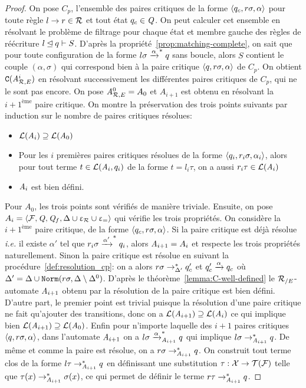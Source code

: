 \begin{proof}
  On pose $C_p$, l'ensemble des paires critiques de la forme $\langle q_c, r\sigma, \alpha\rangle$ pour toute règle $l\rightarrow r \in \mathcal R$ et tout état $q_c \in \mathit Q$.
  On peut calculer cet ensemble en résolvant le problème de filtrage pour chaque état et membre gauche des règles de réécriture $l \unlhd q \vdash S$.
  D'après la propriété~\ref{prop:matching-complete}, on sait que pour toute configuration de la forme $l\sigma \xrightarrow{\alpha}^* q$ sans boucle,
  alors $S$ contient le couple $(\alpha,\sigma)$ qui correspond bien à la paire critique $\langle q, r\sigma, \alpha \rangle$ de $C_p$.
  On obtient $\mathtt{C}({\mathit A}_{\mathcal R,E}^i)$ en résolvant successivement les différentes paires critiques de $C_p$, qui ne le sont pas encore.
  On pose ${\mathit A}_{\mathcal R,E}^0 = A_0$ et $A_{i+1}$ est obtenu en résolvant la $i+1^\text{ème}$ paire critique.
  On montre la préservation des trois points suivants par induction sur le nombre de paires critiques résolues:
  \begin{itemize}
  \item $\mathcal{L}(\mathit A_i) \supseteq \mathcal{L}(\mathit A_0)$
  \item Pour les $i$ premières paires critiques résolues de la forme $\langle q_i, r_i\sigma, \alpha_i\rangle$, alors
    pour tout terme $t \in \mathcal{L}(\mathit A_i, q_i)$ de la forme $t = l_i\tau$, on a aussi $r_i\tau \in \mathcal{L}(\mathit A_i)$
  \item $\mathit A_i$ est bien défini.
  \end{itemize}
  \medskip
  \noindent
  Pour $A_0$, les trois points sont vérifiés de manière triviale. Ensuite, on pose
  $A_i = \langle \mathcal{F}, \mathit Q, \mathit Q_f, \Delta\cup\upvarepsilon_{\mathcal R}\cup\upvarepsilon_{=}\rangle$ qui vérifie les trois propriétés.
  On considère la $i+1^\text{ème}$ paire critique, de la forme $\langle q_c, r\sigma, \alpha\rangle$.
  Si la paire critique est déjà résolue \textit{i.e.} il existe $\alpha'$ tel que
  $r_i\sigma \xrightarrow{\alpha'}^* q_i$, alors $\mathit A_{i+1} = A_i$ et respecte les trois propriétés naturellement.
  Sinon la paire critique est résolue en suivant la procédure~\ref{def:resolution_cp}: on a alors
  $r\sigma \rightarrow_{\Delta'}^* q_c'$ et $q_c'\xrightarrow{\alpha} q_c$ où $\Delta' = \Delta \cup \mathtt{Norm}(r\sigma,\Delta \setminus\Delta^0)$.
  D'après le théorème~\ref{lemma:C-well-defined} le ${\mathcal R_{/E}}$-automate $\mathit A_{i+1}$ obtenu par la résolution de la paire critique
  est bien défini. D'autre part, le premier point est trivial puisque la résolution d'une paire critique ne fait qu'ajouter
  des transitions, donc on a $\mathcal{L}(\mathit A_{i+1}) \supseteq \mathcal{L}(\mathit A_i)$ ce qui implique bien $\mathcal{L}(\mathit A_{i+1}) \supseteq \mathcal{L}(\mathit A_0)$.
  Enfin pour n'importe laquelle des ${i+1}$ paires critiques $\langle q, r\sigma, \alpha\rangle$, dans l'automate $\mathit A_{i+1}$ on a
  $l\sigma \xrightarrow{\alpha}_{\mathit A_{i+1}}^* q$ qui implique $l\sigma \rightarrow_{\mathit A_{i+1}}^* q$. De même et comme la paire est résolue,
  on a $r\sigma \rightarrow_{\mathit A_{i+1}}^* q$. On construit tout terme clos de la forme $l\tau \rightarrow_{\mathit A_{i+1}}^* q$
  en définissant une substitution $\tau : \mathcal X \rightarrow \mathcal{T(F)}$ telle que $\tau(x) \rightarrow_{\mathit A_{i+1}}^* \sigma(x)$, ce qui permet de 
  définir le terme $r\tau \rightarrow^*_{\mathit A_{i+1}} q$.


\end{proof}

